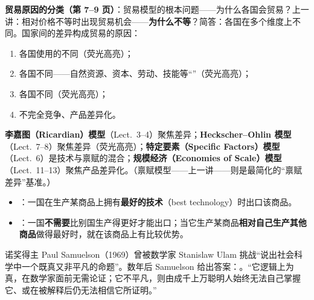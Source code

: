 \textbf{贸易原因的分类（第 7--9 页）}：贸易模型的根本问题——为什么各国会贸易？上一讲：相对价格不等时出现贸易机会——\textbf{为什么不等}？简答：各国在多个维度上不同。国家间的差异构成贸易的原因：
\begin{enumerate}
  \item 各国使用的不同（荧光高亮）；
  \item 各国不同——自然资源、资本、劳动、技能等``''（荧光高亮）；
  \item 各国不同（荧光高亮）；
  \item 不完全竞争、产品差异化。
\end{enumerate}

\begin{intubox}
\textbf{李嘉图（Ricardian）模型}（Lect.\ 3--4）聚焦差异；\textbf{Heckscher--Ohlin 模型}（Lect.\ 7--8）聚焦差异（荧光高亮）；\textbf{特定要素（Specific Factors）模型}（Lect.\ 6）是技术与禀赋的混合；\textbf{规模经济（Economies of Scale）模型}（Lect.\ 11--13）聚焦产品差异化。（禀赋模型——上一讲——则是最简化的``禀赋差异''基准。）
\end{intubox}


\begin{defbox}
\begin{itemize}
  \item {}：一国在生产某商品上拥有\textbf{最好的技术}（best technology）时出口该商品。
  \item {}：一国\textbf{不需要}比别国生产得更好才能出口；当它生产某商品\textbf{相对自己生产其他商品}做得最好时，就在该商品上有比较优势。
\end{itemize}
\end{defbox}

\begin{intubox}
诺奖得主 Paul Samuelson（1969）曾被数学家 Stanislaw Ulam 挑战``说出社会科学中一个既真又非平凡的命题''。数年后 Samuelson 给出答案：。``它逻辑上为真，在数学家面前无需论证；它不平凡，则由成千上万聪明人始终无法自己掌握它、或在被解释后仍无法相信它所证明。''
\end{intubox}

